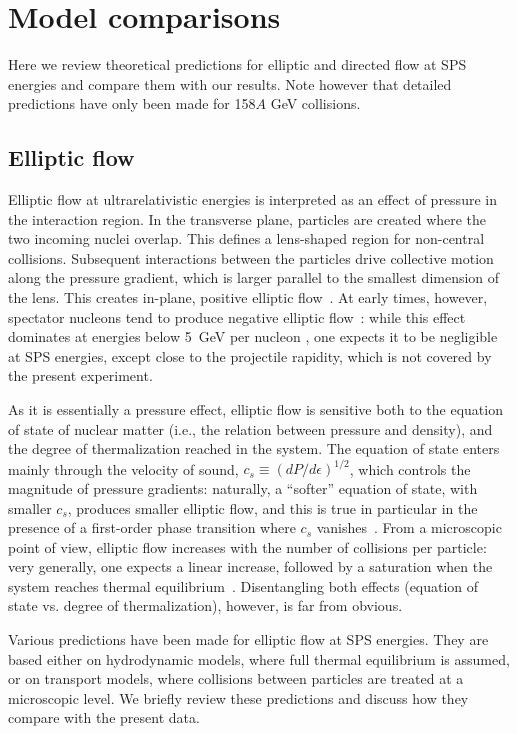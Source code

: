\documentclass[aps,prc,superscriptaddress,showpacs,floatfix,nofootinbib]{revtex4}
\begin{document}
\section{Model comparisons}
\label{s:models}

Here we review theoretical predictions for elliptic and directed flow
at SPS energies and compare them with our results. Note however that
detailed predictions have only been made for 158$A$ GeV
collisions.

\subsection{Elliptic flow}

Elliptic flow at ultrarelativistic energies is interpreted as an
effect of pressure in the interaction region.  In the transverse
plane, particles are created where the two incoming nuclei
overlap. This defines a lens-shaped region for non-central
collisions. Subsequent interactions between the particles drive
collective motion along the pressure gradient, which is larger
parallel to the smallest dimension of the lens. This creates in-plane,
positive elliptic flow~\cite{OL92}.  At early times, however,
spectator nucleons tend to produce negative elliptic
flow~\cite{Sorge:1996pc}: while this effect dominates at energies
below 5~GeV per nucleon \cite{Pinkenburg:1999ya}, one expects it to be
negligible at SPS energies, except close to the projectile rapidity,
which is not covered by the present experiment.

As it is essentially a pressure effect, elliptic flow is sensitive
both to the equation of state of nuclear matter (i.e., the relation
between pressure and density), and the degree of thermalization
reached in the system.  The equation of state enters mainly through
the velocity of sound, $c_s\equiv (dP/d\epsilon)^{1/2}$, which
controls the magnitude of pressure gradients: naturally, a ``softer''
equation of state, with smaller $c_s$, produces smaller elliptic flow,
and this is true in particular in the presence of a first-order phase
transition where $c_s$ vanishes~\cite{OL92}.  From a microscopic point
of view, elliptic flow increases with the number of collisions per
particle: very generally, one expects a linear increase, followed by a
saturation when the system reaches thermal
equilibrium~\cite{Molnar:2001ux}.  Disentangling both effects
(equation of state vs. degree of thermalization), however, is far from
obvious.

Various predictions have been made for elliptic flow at SPS
energies. They are based either on hydrodynamic models, where full
thermal equilibrium is assumed, or on transport models, where
collisions between particles are treated at a microscopic level.  We
briefly review these predictions and discuss how they compare with the
present data.
\end{document}
